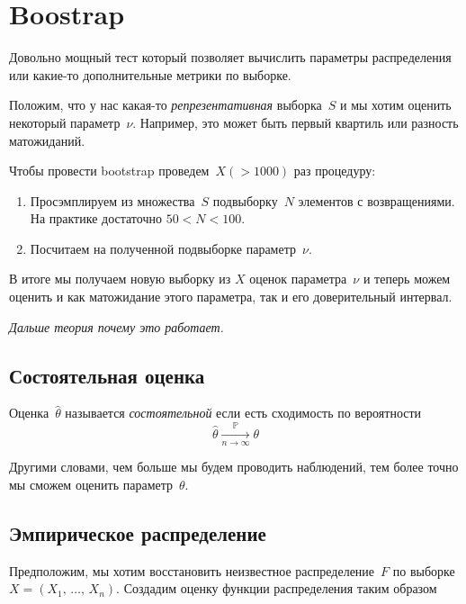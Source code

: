 \documentclass[../handbook.tex]{subfiles}
\begin{document}
\chapter{Boostrap}

Довольно мощный тест который позволяет вычислить параметры распределения или
какие-то дополнительные метрики по выборке.

Положим, что у нас какая-то \emph{репрезентативная} выборка~$S$ и мы хотим
оценить некоторый параметр~$\nu$. Например, это может быть первый квартиль или
разность матожиданий. 

Чтобы провести bootstrap проведем~$X(> 1000)$ раз процедуру:
\begin{enumerate}
    \item Просэмплируем из множества~$S$ подвыборку~$N$ элементов с возвращениями. На практике достаточно $50 < N < 100$.
    \item Посчитаем на полученной подвыборке параметр~$\nu$.
\end{enumerate}
В итоге мы получаем новую выборку из $X$ оценок параметра~$\nu$ и теперь можем оценить и как матожидание этого параметра, так и его доверительный интервал.

\emph{Дальше теория почему это работает.}

\section{Состоятельная оценка}

Оценка~$\hat\theta$ называется \emph{состоятельной} если есть сходимость по вероятности
\begin{equation}
    \label{eq:consisten_estimator}
    \hat\theta \xrightarrow[n \to \infty]{\mathbb{P}} \theta 
\end{equation}

Другими словами, чем больше мы будем проводить наблюдений, тем более точно мы сможем оценить параметр~$\theta$.

\section{Эмпирическое распределение}

Предположим, мы хотим восстановить неизвестное распределение~$F$ по выборке~$X = (X_1,\,\ldots,\,X_n)$. Создадим оценку функции распределения таким образом
\end{document}
